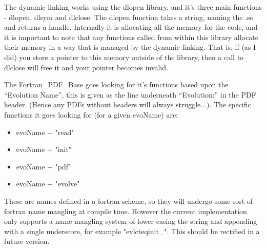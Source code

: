The dynamic linking works using the dlopen library, and it's three main
functions - dlopen, dlsym and dlclose. The dlopen function takes a string,
naming the .so and returns a handle. Internally it is allocating all the
memory for the code, and it is important to note that any functions called
from within this library allocate their memory in a way that is managed by
the dynamic linking. That is, if (as I did) you store a pointer to this
memory outside of the library, then a call to dlclose will free it and your
pointer becomes invalid.

The Fortran\_PDF\_Base goes looking for it's functions based upon the
``Evolution Name'', this is given as the line underneath ``Evolution:'' in
the PDF header. (Hence any PDFs without headers will always struggle...).
The specific functions it goes looking for (for a given evoName) are:

\begin{itemize}
  \item evoName + "read"
  \item evoName + "init"
  \item evoName + "pdf"
  \item evoName + "evolve" 
\end{itemize}

These are names defined in a fortran scheme, so they will undergo some sort
of fortran name mangling at compile time. However the current implementation
only supports a name mangling system of lower casing the string and
appending with a single underscore, for example "evlcteqinit\_". This should
be rectified in a future version.

